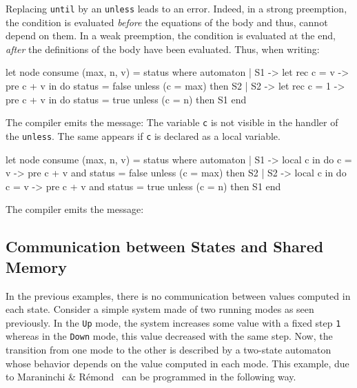 \documentclass[11pt,titlepage,twoside]{report}
\newenvironment{sample}
  {\begin{flushright}\begin{minipage}[t]{15.3cm}\begin{alltt}\small}
  {\end{alltt}\end{minipage}\end{flushright}}
\begin{document}
Replacing \verb-until- by an \verb-unless- leads to an error. Indeed,
in a strong preemption, the condition is evaluated {\em before} the
equations of the body and thus, cannot depend on them. In a weak
preemption, the condition is evaluated at the end, {\em after} the
definitions of the body have been evaluated. Thus, when writing:

\begin{runverbatim}[fail]
let node consume (max, n, v) = status where
  automaton
  | S1 ->
      let rec c = v -> pre c + v in
      do status = false
      unless (c = max) then S2
  | S2 ->
      let rec c = 1 -> pre c + v in
      do status = true
      unless (c = n) then S1
  end
\end{runverbatim}
The compiler emits the message:
\runverbatimerr{}
The variable \verb-c- is not visible in the handler of the \verb-unless-. The
same appears if \verb-c- is declared as a local variable.

\begin{runverbatim}[fail]
let node consume (max, n, v) = status where
  automaton
  | S1 ->
      local c in
      do c = v -> pre c + v and status = false
      unless (c = max) then S2
  | S2 ->
      local c in
      do c = v -> pre c + v and status = true
      unless (c = n) then S1
  end
\end{runverbatim}
The compiler emits the message:
\runverbatimerr{}

\subsection{Communication between States and Shared Memory} %

In the previous examples, there is no communication between values
computed in each state. Consider a simple system made of two running
modes as seen previously. In the \verb-Up- mode, the system increases
some value with a fixed step \verb-1- whereas in the \verb-Down- mode,
this value decreased with the same step. Now, the transition from one
mode to the other is described by a two-state automaton whose behavior
depends on the value computed in each mode. This example, due to
Maraninchi \& R\'emond~\cite{Modes-SCP03} can be programmed in the
following way.
\end{document}
